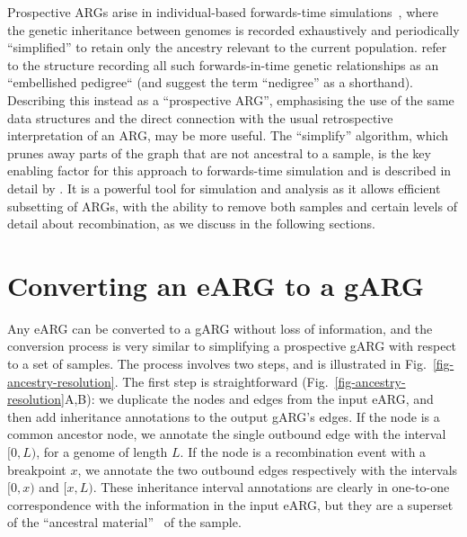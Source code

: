 \documentclass{article}
\begin{document}
Prospective ARGs arise in individual-based forwards-time
simulations~\citep{kelleher2018efficient,haller2018tree},
where the genetic inheritance between genomes is recorded
exhaustively and periodically
``simplified'' to retain only
the ancestry relevant to the current population.
\citet{kelleher2018efficient} refer to the structure
recording all such forwards-in-time genetic relationships
as an ``embellished pedigree`` (and suggest the term ``nedigree'' as a shorthand).
Describing this instead as a ``prospective ARG'', emphasising
the use of the same data structures and the direct connection with
the usual retrospective interpretation of an ARG, may be
more useful.
The ``simplify'' algorithm, which prunes away parts of the graph that
are not ancestral to a sample, is the key enabling factor for
this approach to forwards-time simulation and is
described in detail by
\citet{kelleher2018efficient}.
It is a powerful tool for simulation and analysis as it
allows efficient subsetting of ARGs, with the ability to
remove both samples and certain levels of detail about recombination,
as we discuss in the following sections.

\section*{Converting an eARG to a gARG}
Any eARG can be converted to a gARG without loss of information,
and the conversion process is very similar to
simplifying a prospective gARG with respect to a set of samples.
The process involves two steps, and is illustrated in
Fig.~\ref{fig-ancestry-resolution}.
The first step is straightforward (Fig.~\ref{fig-ancestry-resolution}A,B):
we duplicate the nodes and
edges from the input eARG, and then add inheritance annotations
to the output gARG's edges. If the node is a common ancestor node,
we annotate the single outbound edge with the interval $[0,L)$,
for a genome of length $L$.
If the node is a recombination event with a breakpoint $x$,
we annotate the two outbound edges respectively with the intervals $[0, x)$ and $[x, L)$.
These inheritance interval annotations are clearly in one-to-one
correspondence with the information in the input eARG,
but they are a superset of the
``ancestral material''~\citep{wiuf1999ancestry,wiuf1999recombination}
of the sample.
\end{document}
